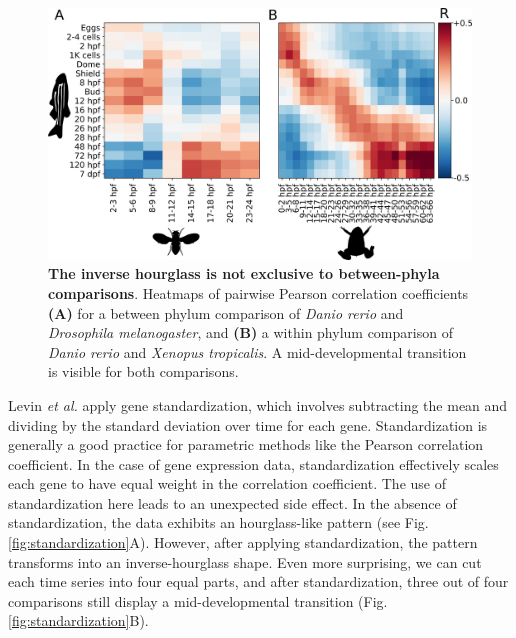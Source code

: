 \begin{figure}[H]
    \includegraphics[width=\linewidth]{ch.hourglass/images/within_between_phyla.png}
    \caption{\textbf{The inverse hourglass is not exclusive to between-phyla comparisons}. Heatmaps of pairwise Pearson correlation coefficients \textbf{(A)} for a between phylum comparison of \textit{Danio rerio} and \textit{Drosophila melanogaster}, and \textbf{(B)} a within phylum comparison of \textit{Danio rerio} and \textit{Xenopus tropicalis}. A mid-developmental transition is visible for both comparisons.}
    \label{fig:within_phylum}
\end{figure}

Levin \textit{et al.} apply gene standardization, which involves subtracting the mean and dividing by the standard deviation over time for each gene. Standardization is generally a good practice for parametric methods like the Pearson correlation coefficient. In the case of gene expression data, standardization effectively scales each gene to have equal weight in the correlation coefficient. The use of standardization here leads to an unexpected side effect. In the absence of standardization, the data exhibits an hourglass-like pattern (see Fig. \ref{fig:standardization}A). However, after applying standardization, the pattern transforms into an inverse-hourglass shape. Even more surprising, we can cut each time series into four equal parts, and after standardization, three out of four comparisons still display a mid-developmental transition (Fig. \ref{fig:standardization}B). 

